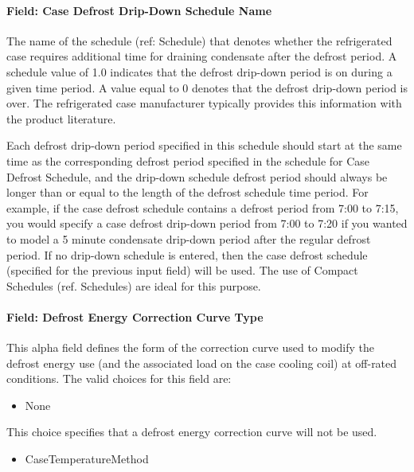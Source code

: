 \paragraph{Field: Case Defrost Drip-Down Schedule Name}\label{field-case-defrost-drip-down-schedule-name}

The name of the schedule (ref: Schedule) that denotes whether the refrigerated case requires additional time for draining condensate after the defrost period. A schedule value of 1.0 indicates that the defrost drip-down period is on during a given time period. A value equal to 0 denotes that the defrost drip-down period is over. The refrigerated case manufacturer typically provides this information with the product literature.

Each defrost drip-down period specified in this schedule should start at the same time as the corresponding defrost period specified in the schedule for Case Defrost Schedule, and the drip-down schedule defrost period should always be longer than or equal to the length of the defrost schedule time period. For example, if the case defrost schedule contains a defrost period from 7:00 to 7:15, you would specify a case defrost drip-down period from 7:00 to 7:20 if you wanted to model a 5 minute condensate drip-down period after the regular defrost period. If no drip-down schedule is entered, then the case defrost schedule (specified for the previous input field) will be used. The use of Compact Schedules (ref. Schedules) are ideal for this purpose.

\paragraph{Field: Defrost Energy Correction Curve Type}\label{field-defrost-energy-correction-curve-type}

This alpha field defines the form of the correction curve used to modify the defrost energy use (and the associated load on the case cooling coil) at off-rated conditions. The valid choices for this field are:

\begin{itemize}
\tightlist
\item
  None
\end{itemize}

This choice specifies that a defrost energy correction curve will not be used.

\begin{itemize}
\tightlist
\item
  CaseTemperatureMethod
\end{itemize}


